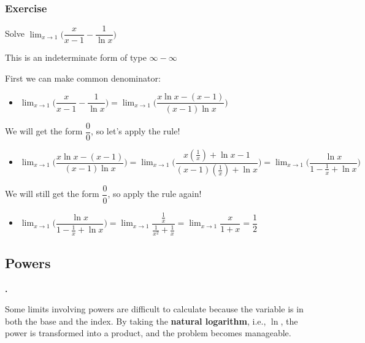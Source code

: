 \documentclass[t]{beamer}
\theoremstyle{plain}
\theoremstyle{definition}
\newcounter{heading}
\newcommand{\newhead}[1]{\medskip\stepcounter{heading}\noindent\textbf{\hspace{0.2cm}{#1}.}}
\newcommand{\limm}[1]{\displaystyle \lim_{x\to #1}}
\begin{document}
\begin{frame}

\frametitle{Exercise}

\footnotesize

Solve $\limm{1}\big(\dfrac{x}{x-1} - \dfrac{1}{\ln{x}}\big)$

This is an indeterminate form of type $\infty - \infty$  \pause

\medskip

First we can make common denominator:

\begin{itemize}
	\item $\limm{1}\big(\dfrac{x}{x-1} - \dfrac{1}{\ln{x}}\big) = \limm{1}\big(\dfrac{x\ln{x} - (x-1)}{(x-1)\ln{x}}\big)$
\end{itemize}

We will get the form $\dfrac{0}{0}$, so let's apply the rule!

\begin{itemize}
	\item $ \limm{1}\big(\dfrac{x\ln{x} - (x-1)}{(x-1)\ln{x}}\big) =  \limm{1}\big(\dfrac{x(\frac{1}{x}) + \ln{x} - 1}{(x-1)(\frac{1}{x}) + \ln{x}}\big) =  \limm{1}\big(\dfrac{\ln{x}}{1-\frac{1}{x} + \ln{x}}\big)$
\end{itemize}

We will still get the form $\dfrac{0}{0}$, so apply the rule again!

\begin{itemize}
	\item $\limm{1}\big(\dfrac{\ln{x}}{1-\frac{1}{x} + \ln{x}}\big) = \limm{1}\dfrac{\frac{1}{x}}{\frac{1}{x^2} + \frac{1}{x}} = \limm{1}\dfrac{x}{1+x} = \dfrac{1}{2}$ 
\end{itemize}

\end{frame}

\subsection{Powers}


\begin{frame}
\newhead{Indetermininate forms with powers}

\noindent Some limits involving powers are difficult to calculate because the variable is in both the base and the index. By taking the \textbf{natural logarithm}, i.e., $\ln$, the power is transformed into a product, and the problem becomes manageable.

\end{frame}
\end{document}
